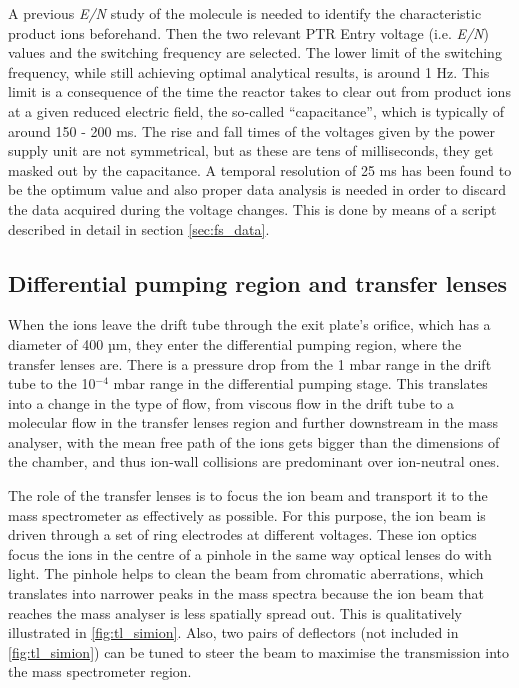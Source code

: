 A previous \textit{E/N} study of the molecule is needed to identify  the characteristic product ions beforehand. Then the two relevant PTR Entry voltage (i.e. \textit{E/N}) values and the switching frequency are selected.
The lower limit of the switching frequency, while still achieving optimal analytical results, is around 1 Hz.
This limit is a consequence of the time the reactor takes to clear out from product ions at a given reduced electric field, the so-called ``capacitance'', which is typically of around 150 - 200 ms.
The rise and fall times of the voltages given by the power supply unit are not symmetrical, but as these are tens of milliseconds, they get masked out by the capacitance.
A temporal resolution of 25 ms has been found to be the optimum value %
and  also proper data analysis is needed in order to discard the data acquired during the voltage changes.
This is done by means of a script %
described in detail in  section \ref{sec:fs_data}.













\subsection{Differential pumping region and transfer lenses}
When the ions leave the drift tube through the exit plate's orifice, which has a diameter of 400 µm, they enter the differential pumping region, where the transfer lenses are. There is a pressure drop from the 1 mbar range in the drift tube to the 10$^{-4}$ mbar range in the differential pumping stage. This translates into a change in the type of flow, from viscous flow in the drift tube to a molecular flow in the transfer lenses region and further downstream in the mass analyser, 
with %
the mean free path of the ions gets bigger than the dimensions of the chamber,
and thus ion-wall collisions are predominant over ion-neutral %
ones.

The role of the transfer lenses is to focus the ion beam and transport it to the mass spectrometer as effectively as possible. For this purpose, the ion beam is driven through a set of ring electrodes at different voltages. These ion optics focus the ions in the centre of a pinhole in the same way optical lenses do with light. The pinhole helps to clean the beam from chromatic aberrations, which translates into narrower peaks in the mass spectra because the ion beam that reaches the mass analyser is less spatially spread out.
This is qualitatively illustrated in \autoref{fig:tl_simion}.
Also, two pairs of deflectors (not included in \autoref{fig:tl_simion}) can be tuned to steer the beam to maximise the transmission into the mass spectrometer region.


